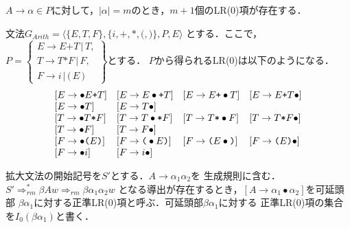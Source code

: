 \documentclass[a4j,dvipdfmx]{jbook}
\begin{document}
$A\rightarrow\alpha\in P$に対して，$|\alpha|=m$のとき，$m+1$個のLR(0)項が存在する．
\begin{Exmp}\label{ArithmeticExample}
  文法$G_{Arith}=\langle\{E,T,F\},\{i,\texttt{+},\texttt{*},\texttt{(},\texttt{)}\},P,E\rangle$
  とする．ここで，\\$P=\left\{\begin{array}{l}
    E\rightarrow E\texttt{+}T\,|\,T, \\
    T\rightarrow T\texttt{*}F\,|\,F, \\
    F\rightarrow i\,|\,\texttt{(}\,E\,\texttt{)}
  \end{array}\right\}$とする．
  $P$から得られるLR(0)は以下のようになる．
  \[\begin{array}{llll}
      [E\rightarrow\bullet E\texttt{+}T]         & [E\rightarrow E\bullet\texttt{+}T]
                                                 & [E\rightarrow E\texttt{+}\bullet T]         & [E\rightarrow E\texttt{+}T\bullet]         \\\relax
      [E\rightarrow\bullet T]                    & [E\rightarrow T\bullet]                                                                  \\\relax
      [T\rightarrow\bullet T\texttt{*}F]         & [T\rightarrow T\bullet\texttt{*}F]
                                                 & [T\rightarrow T\texttt{*}\bullet F]         & [T\rightarrow T\texttt{*}F\bullet]         \\\relax
      [T\rightarrow\bullet F]                    & [T\rightarrow F\bullet]                                                                  \\\relax
      [F\rightarrow\bullet\texttt{(}E\texttt{)}] & [F\rightarrow\texttt{(}\bullet E\texttt{)}]
                                                 & [F\rightarrow\texttt{(}E\bullet\texttt{)}]  & [F\rightarrow\texttt{(}E\texttt{)}\bullet] \\\relax
      [F\rightarrow\bullet i]                    & [F\rightarrow i\bullet]
    \end{array}\]
\end{Exmp}

\begin{Def}
  拡大文法の開始記号を$S'$とする．$A\rightarrow\alpha_1\alpha_2$を
  生成規則に含む．
  $S'\Rightarrow_{rm}^\ast\beta A w\Rightarrow_{rm}\beta\alpha_1\alpha_2 w$
  となる導出が存在するとき，$[A\rightarrow\alpha_1\bullet\alpha_2]$を可延頭部
  $\beta\alpha_1$に対する正準LR(0)項と呼ぶ．可延頭部$\beta\alpha_1$に対する
  正準LR(0)項の集合を$I_0(\beta\alpha_1)$と書く．
\end{Def}
\end{document}
